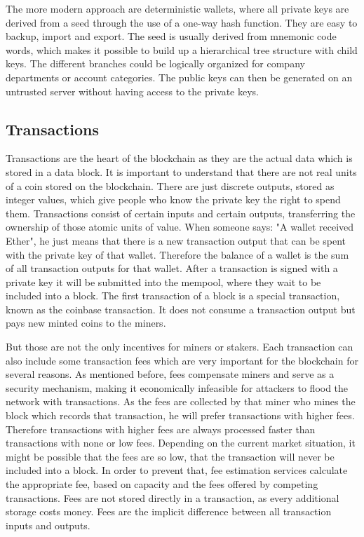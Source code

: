 The more modern approach are deterministic wallets, where all private keys are derived from a seed through the use of a one-way hash function. They are easy to
backup, import and export. The seed is usually derived from mnemonic code words, which makes it possible to build up a hierarchical tree structure with child keys.
The different branches could be logically organized for company departments or account categories. The public keys can then be generated on an untrusted server
without having access to the private keys.

\subsection{Transactions}
Transactions are the heart of the blockchain as they are the actual data which is stored in a data block. It is important to understand that there are not real
units of a coin stored on the blockchain. There are just discrete outputs, stored as integer values, which give people who know the private key the right to spend
them. Transactions consist of certain inputs and certain outputs, transferring the ownership of those atomic units of value. When someone says: "A wallet received
Ether", he just means that there is a new transaction output that can be spent with the private key of that wallet. Therefore the balance of a wallet is the sum of
all transaction outputs for that wallet. After a transaction is signed with a private key it will be submitted into the mempool, where they wait to be included into
a block. The first transaction of a block is a special transaction, known as the coinbase transaction. It does not consume a transaction output but pays new minted
coins to the miners.

But those are not the only incentives for miners or stakers. Each transaction can also include some transaction fees which are very important
for the blockchain for several reasons. As mentioned before, fees compensate miners and serve as a security mechanism, making it economically infeasible for attackers
to flood the network with transactions. As the fees are collected by that miner who mines the block which records that transaction, he will prefer transactions with
higher fees. Therefore transactions with higher fees are always processed faster than transactions with none or low fees. Depending on the current market situation,
it might be possible that the fees are so low, that the transaction will never be included into a block. In order to prevent that, fee estimation services calculate
the appropriate fee, based on capacity and the fees offered by competing transactions. Fees are not stored directly in a transaction, as every additional storage
costs money. Fees are the implicit difference between all transaction inputs and outputs.

